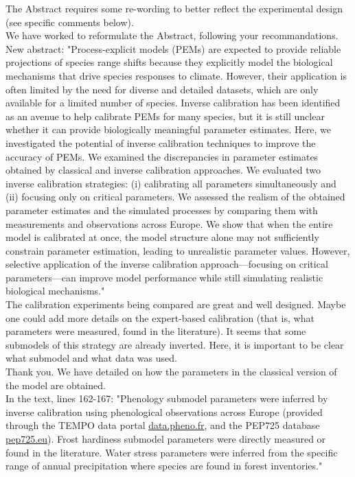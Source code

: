\documentclass[a4paper, 11pt]{article}
\begin{document}
\noindent The Abstract requires some re-wording to better reflect the experimental design (see specific comments below).\\
\textcolor{customblue}{We have worked to reformulate the Abstract, following your recommandations.}\\
New abstract: \textcolor{customred}{"Process-explicit models (PEMs) are expected to provide reliable projections of species range shifts because they explicitly model the biological mechanisms that drive species responses to climate.
However, their application is often limited by the need for diverse and detailed datasets, which are only available for a limited number of species. Inverse calibration has been identified as an avenue to help calibrate PEMs for many species, but it is still unclear whether it can provide biologically meaningful parameter estimates.
Here, we investigated the potential of inverse calibration techniques to improve the accuracy of PEMs. We examined the discrepancies in parameter estimates obtained by classical and inverse calibration approaches. We evaluated two inverse calibration strategies: (i) calibrating all parameters simultaneously and (ii) focusing only on critical parameters.  
We assessed the realism of the obtained parameter estimates and the simulated processes by comparing them with measurements and observations across Europe. We show that when the entire model is calibrated at once, the model structure alone may not sufficiently constrain parameter estimation, leading to unrealistic parameter values. However, selective application of the inverse calibration approach---focusing on critical parameters---can improve model performance while still simulating realistic biological mechanisms."}\\ 

\noindent The calibration experiments being compared are great and well designed. Maybe one could add more details on the expert-based calibration (that is, what parameters were measured, found in the literature). It seems that some submodels of this strategy are already inverted. Here, it is important to be clear what submodel and what data was used.\\
\textcolor{customblue}{Thank you. We have detailed on how the parameters in the classical version of the model are obtained.}\\
In the text, lines 162-167: \textcolor{customred}{"Phenology submodel parameters were inferred by inverse \textcolor{customred}{calibration} using phenological \textcolor{customred}{observations} across Europe (provided through the TEMPO data portal \url{data.pheno.fr}, and the PEP725 database \url{pep725.eu}).
\textcolor{customred}{Frost hardiness submodel parameters were directly measured or found in the literature. Water stress parameters were inferred from the specific range of annual precipitation where species are found in forest inventories.}"}\\
\end{document}

